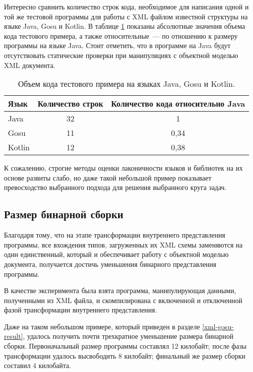 Интересно сравнить количество строк кода, необходимое для написания одной и той же тестовой программы для работы с XML файлом известной структуры на языке Java, Gosu и Kotlin.
В таблице \ref{tab:comparation_java_gosu_kotlin} показаны абсолютные значения объема кода тестового примера, а также относительные~--- по отношению к размеру программы на языке Java.
Стоит отметить, что в программе на Java будут отсутствовать статические проверки при манипуляциях с объектной моделью XML документа.

\begin{table}[!h]\begin{center}
\begin{center}
    \begin{tabular}{ | l | c | c | }
    \hline
    Язык 	& Количество строк & Количество кода относительно Java \\ \hline
    Java 	& 32 	& 1 \\ \hline
    Gosu   	& 11 	& 0,34  \\ \hline
    Kotlin 	& 12 	& 0,38 \\
    \hline
    \end{tabular}
\end{center}
\caption{Объем кода тестового примера на языках Java, Gosu и Kotlin.}
\label{tab:comparation_java_gosu_kotlin}
\end{center}
\end{table}

К сожалению, строгие методы оценки лаконичности языков и библиотек на их основе развиты слабо, но даже такой небольшой пример показывает превосходство выбранного подхода для решения выбранного круга задач.

\subsection{Размер бинарной сборки}
Благодаря тому, что на этапе трансформации внутреннего представления программы, все вхождения типов, загруженных их XML схемы заменяются на один единственный, который и обеспечивает работу с объектной моделью документа, получается достичь уменьшения бинарного представления программы.

В качестве эксперимента была взята программа, манипулирующая данными, полученными из XML файла, и скомпилирована с включенной и отключенной фазой трансформации внутреннего представления.

Даже на таком небольшом примере, который приведен в разделе \ref{xml-gosu-result}, удалось получить почти трехкратное уменьшение размера бинарной сборки.
Первоначальный размер программы составлял 12 килобайт; после фазы трансформации удалось высвободить 8 килобайт; финальный же размер сборки составил 4 килобайта.

